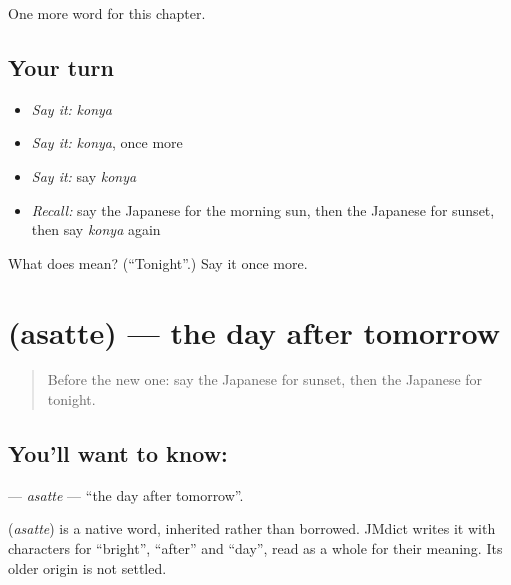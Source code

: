 \begin{grammarlens}[title={What you've built}]
One more word for this chapter.
\end{grammarlens}

\subsection*{Your turn}
\begin{itemize}
\raggedright
  \item \emph{Say it:} \emph{konya}
  \item \emph{Say it:} \emph{konya}, once more
  \item \emph{Say it:} say \emph{konya}
  \item \emph{Recall:} say the Japanese for the morning sun, then the Japanese for sunset, then say \emph{konya} again
\end{itemize}

\begin{tcolorbox}[breakable,colback=teal!4,colframe=teal!35!black,title={Before you move on}]
What does  mean? (\textquotedblleft{}Tonight\textquotedblright{}.) Say it once more.
\end{tcolorbox}
\section[\texorpdfstring{\ja{あさって} (asatte)}{あさって (asatte)}]{ (asatte) — the day after tomorrow}

\label{lesson:JA-C73-asatte}



\begin{quote}
Before the new one: say the Japanese for sunset, then the Japanese for tonight.
\end{quote}

\subsection*{You'll want to know: }
\textbf{} — \emph{asatte} — \textquotedblleft{}the day after tomorrow\textquotedblright{}.

\begin{cousinweb}
\textbf{} (\emph{asatte}) is a native word, inherited rather than borrowed. JMdict writes it with characters for \textquotedblleft{}bright\textquotedblright{}, \textquotedblleft{}after\textquotedblright{} and \textquotedblleft{}day\textquotedblright{}, read as a whole for their meaning. Its older origin is not settled.
\end{cousinweb}

